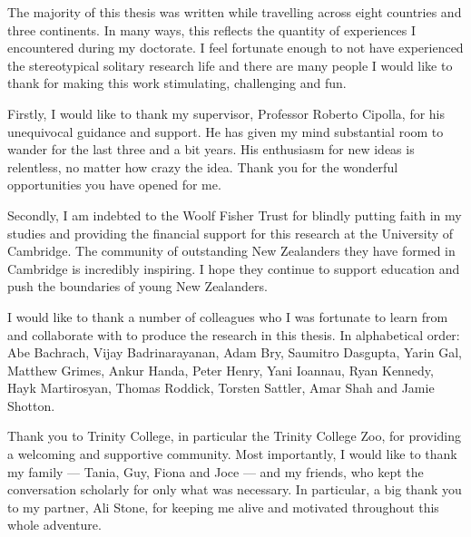 
\begin{acknowledgements}     

The majority of this thesis was written while travelling across eight countries and three continents. In many ways, this reflects the quantity of experiences I encountered during my doctorate. I feel fortunate enough to not have experienced the stereotypical solitary research life and there are many people I would like to thank for making this work stimulating, challenging and fun.

Firstly, I would like to thank my supervisor, Professor Roberto Cipolla, for his unequivocal guidance and support. He has given my mind substantial room to wander for the last three and a bit years. His enthusiasm for new ideas is relentless, no matter how crazy the idea. Thank you for the wonderful opportunities you have opened for me.

Secondly, I am indebted to the Woolf Fisher Trust for blindly putting faith in my studies and providing the financial support for this research at the University of Cambridge. The community of outstanding New Zealanders they have formed in Cambridge is incredibly inspiring. I hope they continue to support education and push the boundaries of young New Zealanders.

I would like to thank a number of colleagues who I was fortunate to learn from and collaborate with to produce the research in this thesis. In alphabetical order: Abe Bachrach, Vijay Badrinarayanan, Adam Bry, Saumitro Dasgupta, Yarin Gal, Matthew Grimes, Ankur Handa, Peter Henry, Yani Ioannau, Ryan Kennedy, Hayk Martirosyan, Thomas Roddick, Torsten Sattler, Amar Shah and Jamie Shotton.

Thank you to Trinity College, in particular the Trinity College Zoo, for providing a welcoming and supportive community. Most importantly, I would like to thank my family --- Tania, Guy, Fiona and Joce --- and my friends, who kept the conversation scholarly for only what was necessary. In particular, a big thank you to my partner, Ali Stone, for keeping me alive and motivated throughout this whole adventure.



\end{acknowledgements}
